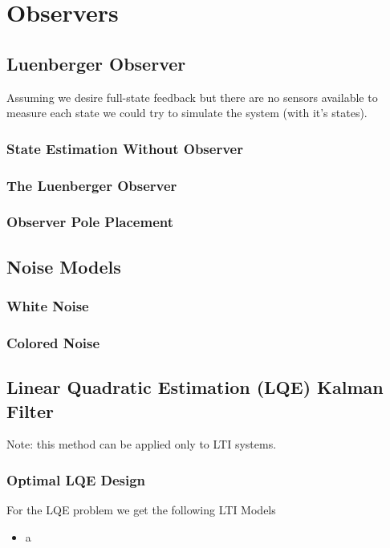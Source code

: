\section{Observers}
\subsection{Luenberger Observer}
Assuming we desire full-state feedback but there are no sensors available to measure each state we could try to simulate the system (with it's states).

\subsubsection{State Estimation Without Observer}


\subsubsection{The Luenberger Observer}

\subsubsection{Observer Pole Placement}

%


%


\subsection{Noise Models}
\subsubsection{White Noise}

\subsubsection{Colored Noise}



\subsection{Linear Quadratic Estimation (LQE) Kalman Filter}
Note: this method can be applied only to LTI systems.

\subsubsection{Optimal LQE Design}
For the LQE problem we get the following LTI Models

%
\begin{itemize}
    \item a
\end{itemize}